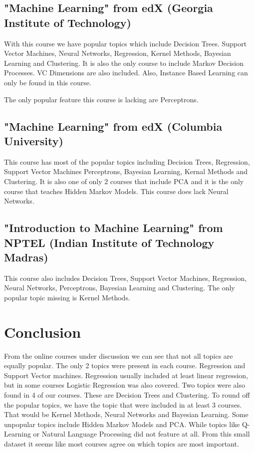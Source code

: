 \documentclass[10pt,a4paper]{article}
\begin{document}
\subsection{"Machine Learning" from edX (Georgia Institute of Technology)}
 
With this course we have popular topics which include Decision Trees. Support Vector Machines, Neural Networks, Regression, Kernel Methods, Bayesian Learning and Clustering. It is also the only course to include Markov Decision Processes. VC Dimensions are also included. Also, Instance Based Learning can only be found in this course.
 
The only popular feature this course is lacking are Perceptrons.\citep{georg}

\subsection{"Machine Learning" from edX (Columbia University)}

This course has most of the popular topics including Decision Trees, Regression, Support Vector Machines Perceptrons, Bayesian Learning, Kernal Methods and Clustering. It is also one of only 2 courses that include PCA and it is the only course that teaches Hidden Markov Models.
This course does lack Neural Networks. \citep{col}

\subsection{"Introduction to Machine Learning" from NPTEL (Indian Institute of Technology Madras)}

This course also includes Decision Trees, Support Vector Machines, Regression, Neural Networks, Perceptrons, Bayesian Learning and Clustering.
The only popular topic missing is Kernel Methods. \citep{mad}

\section{Conclusion}

From the online courses under discussion we can see that not all topics are equally popular. The only 2 topics were present in each course. Regression and Support Vector machines. Regression usually included at least linear regression, but in some courses Logistic Regression was also covered. Two topics were also found in 4 of our courses. These are Decision Trees and Clustering. To round off the popular topics, we have the topic that were included in at least 3 courses. That would be Kernel Methods, Neural Networks and Bayesian Learning. 
Some unpopular topics include Hidden Markov Models and PCA. While topics like Q-Learning or Natural Language Processing did not feature at all.
From this small dataset it seems like most courses agree on which topics are most important.


\end{document}
